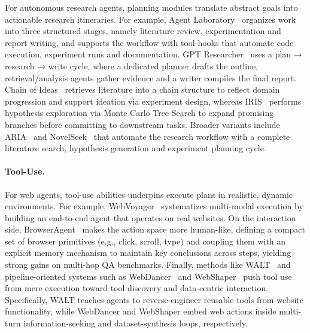 For autonomous research agents, planning modules translate abstract goals into actionable research itineraries.  For example, Agent Laboratory~\cite{schmidgall2025agentlaboratoryusingllm} organizes work into three structured stages, namely literature review, experimentation and report writing, and supports the workflow with tool-hooks that automate code execution, experiment runs and documentation. GPT Researcher~\cite{Elovic2023gptresearcher} uses a plan → research → write cycle, where a dedicated planner drafts the outline, retrieval/analysis agents gather evidence and a writer compiles the final report. Chain of Ideas~\cite{li2024chainideasrevolutionizingresearch} retrieves literature into a chain structure to reflect domain progression and support ideation via experiment design, whereas IRIS~\cite{garikaparthi2025iris} performs hypothesis exploration via Monte Carlo Tree Search to expand promising branches before committing to downstream tasks. Broader variants include ARIA~\cite{ramirezmedina2025acceleratingscientificresearchmultillm} and NovelSeek~\cite{novelseekteam2025novelseekagentscientist} that automate the research workflow with a complete literature search, hypothesis generation and experiment planning cycle.




\paragraph{Tool-Use.}



For web agents, tool-use abilities underpins execute plans in realistic, dynamic environments. For example, WebVoyager~\cite{he2024webvoyager} systematizes multi-modal execution by building an end-to-end agent that operates on real websites. On the interaction side, BrowserAgent~\cite{zhang2025browseragent} makes the action space more human-like, defining a compact set of browser primitives (e.g., click, scroll, type) and coupling them with an explicit memory mechanism to maintain key conclusions across steps, yielding strong gains on multi-hop QA benchmarks. Finally, methods like WALT~\cite{prabhu2025walt} and pipeline-oriented systems such as WebDancer~\cite{wu2025webdancer} and WebShaper~\cite{tao2025webshaper} push tool use from mere execution toward tool discovery and data-centric interaction. Specifically, WALT teaches agents to reverse-engineer reusable tools from website functionality, while WebDancer and WebShaper embed web actions inside multi-turn information-seeking and dataset-synthesis loops, respectively.


